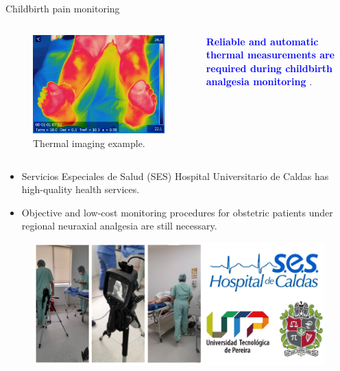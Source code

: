 \documentclass[aspectratio=169]{beamer}
\let\oldcite\cite %
\renewcommand{\cite}[1]{{\tiny\oldcite{#1}}}
\begin{document}
\begin{frame}[allowframebreaks]{Childbirth pain monitoring}
\begin{columns}
\begin{figure}
    \centering
    \includegraphics[width=0.8\linewidth]{Figures/t20rainbow.jpg}
    \caption{Thermal imaging example.}
\end{figure}




\textcolor{blue}{\textbf{Reliable and automatic thermal measurements are required during childbirth analgesia monitoring}} {\tiny{\cite{PMID:25232864}}}.


\end{columns}

\framebreak


\begin{itemize}
    \item Servicios Especiales de Salud (SES) Hospital Universitario de Caldas has high-quality health services.
    \item Objective and low-cost monitoring procedures for obstetric patients under regional neuraxial analgesia are still necessary.
\end{itemize}
 

\begin{figure}
    \centering
    \includegraphics[width=0.7\linewidth]{Figures/ses_unal_utp.pdf}
\end{figure}


\end{frame}
\end{document}

